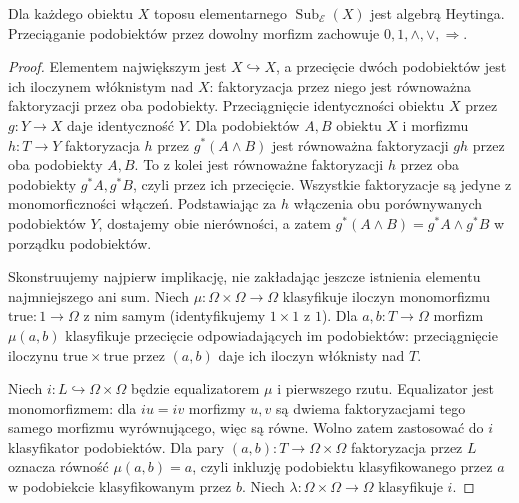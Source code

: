 \begin{twierdzenie}\label{cat:thm:elementary-heyting}
Dla każdego obiektu $X$ toposu elementarnego $\operatorname{Sub}_{\mathcal E}(X)$ jest algebrą Heytinga. Przeciąganie podobiektów przez dowolny morfizm zachowuje $0,1,\wedge,\vee,\Rightarrow$.
\end{twierdzenie}
\begin{proof}
Elementem największym jest $X\hookrightarrow X$, a przecięcie dwóch podobiektów jest ich iloczynem włóknistym nad $X$: faktoryzacja przez niego jest równoważna faktoryzacji przez oba podobiekty. Przeciągnięcie identyczności obiektu $X$ przez $g:Y\to X$ daje identyczność $Y$. Dla podobiektów $A,B$ obiektu $X$ i morfizmu $h:T\to Y$ faktoryzacja $h$ przez $g^*(A\wedge B)$ jest równoważna faktoryzacji $gh$ przez oba podobiekty $A,B$. To z kolei jest równoważne faktoryzacji $h$ przez oba podobiekty $g^*A,g^*B$, czyli przez ich przecięcie. Wszystkie faktoryzacje są jedyne z monomorficzności włączeń. Podstawiając za $h$ włączenia obu porównywanych podobiektów $Y$, dostajemy obie nierówności, a zatem $g^*(A\wedge B)=g^*A\wedge g^*B$ w porządku podobiektów.

Skonstruujemy najpierw implikację, nie zakładając jeszcze istnienia elementu najmniejszego ani sum. Niech $\mu:\Omega\times\Omega\to\Omega$ klasyfikuje iloczyn monomorfizmu $\mathrm{true}:1\to\Omega$ z nim samym (identyfikujemy $1\times1$ z $1$). Dla $a,b:T\to\Omega$ morfizm $\mu(a,b)$ klasyfikuje przecięcie odpowiadających im podobiektów: przeciągnięcie iloczynu $\mathrm{true}\times\mathrm{true}$ przez $(a,b)$ daje ich iloczyn włóknisty nad $T$.

Niech $i:L\hookrightarrow\Omega\times\Omega$ będzie equalizatorem $\mu$ i pierwszego rzutu. Equalizator jest monomorfizmem: dla $iu=iv$ morfizmy $u,v$ są dwiema faktoryzacjami tego samego morfizmu wyrównującego, więc są równe. Wolno zatem zastosować do $i$ klasyfikator podobiektów. Dla pary $(a,b):T\to\Omega\times\Omega$ faktoryzacja przez $L$ oznacza równość $\mu(a,b)=a$, czyli inkluzję podobiektu klasyfikowanego przez $a$ w podobiekcie klasyfikowanym przez $b$. Niech $\lambda:\Omega\times\Omega\to\Omega$ klasyfikuje $i$.


\end{proof}
